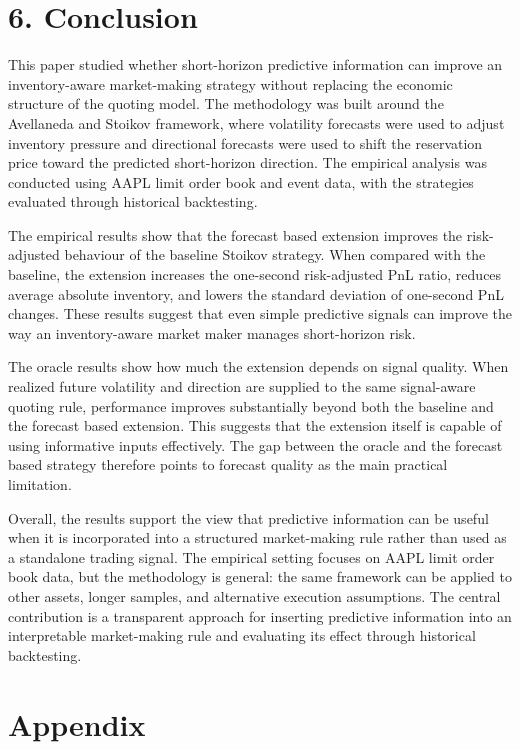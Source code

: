 \documentclass[12pt,a4paper]{article}
\let\originalsection\section
\renewcommand{\section}{\clearpage\originalsection}
\begin{document}
\section{6. Conclusion}\label{conclusion}

This paper studied whether short-horizon predictive information can
improve an inventory-aware market-making strategy without replacing the
economic structure of the quoting model. The methodology was built
around the Avellaneda and Stoikov framework, where volatility forecasts
were used to adjust inventory pressure and directional forecasts were
used to shift the reservation price toward the predicted short-horizon
direction. The empirical analysis was conducted using AAPL limit order
book and event data, with the strategies evaluated through historical
backtesting.

The empirical results show that the forecast based extension improves
the risk-adjusted behaviour of the baseline Stoikov strategy. When
compared with the baseline, the extension increases the one-second
risk-adjusted PnL ratio, reduces average absolute inventory, and lowers
the standard deviation of one-second PnL changes. These results suggest
that even simple predictive signals can improve the way an
inventory-aware market maker manages short-horizon risk.

The oracle results show how much the extension depends on signal
quality. When realized future volatility and direction are supplied to
the same signal-aware quoting rule, performance improves substantially
beyond both the baseline and the forecast based extension. This suggests
that the extension itself is capable of using informative inputs
effectively. The gap between the oracle and the forecast based strategy
therefore points to forecast quality as the main practical limitation.

Overall, the results support the view that predictive information can be
useful when it is incorporated into a structured market-making rule
rather than used as a standalone trading signal. The empirical setting
focuses on AAPL limit order book data, but the methodology is general:
the same framework can be applied to other assets, longer samples, and
alternative execution assumptions. The central contribution is a
transparent approach for inserting predictive information into an
interpretable market-making rule and evaluating its effect through
historical backtesting.

\section{Appendix}\label{appendix}
\end{document}
